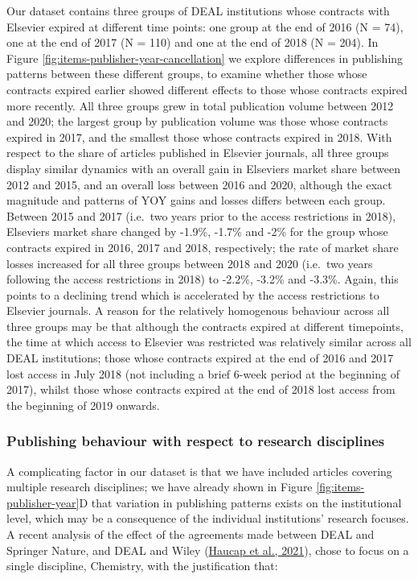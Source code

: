 \documentclass[
]{article}
\begin{document}
Our dataset contains three groups of DEAL institutions whose contracts with Elsevier expired at different time points: one group at the end of 2016 (N = 74), one at the end of 2017 (N = 110) and one at the end of 2018 (N = 204). In Figure \ref{fig:items-publisher-year-cancellation} we explore differences in publishing patterns between these different groups, to examine whether those whose contracts expired earlier showed different effects to those whose contracts expired more recently. All three groups grew in total publication volume between 2012 and 2020; the largest group by publication volume was those whose contracts expired in 2017, and the smallest those whose contracts expired in 2018. With respect to the share of articles published in Elsevier journals, all three groups display similar dynamics with an overall gain in Elsevier\textquotesingle s market share between 2012 and 2015, and an overall loss between 2016 and 2020, although the exact magnitude and patterns of YOY gains and losses differs between each group. Between 2015 and 2017 (i.e.~two years prior to the access restrictions in 2018), Elsevier\textquotesingle s market share changed by -1.9\%, -1.7\% and -2\% for the group whose contracts expired in 2016, 2017 and 2018, respectively; the rate of market share losses increased for all three groups between 2018 and 2020 (i.e.~two years following the access restrictions in 2018) to -2.2\%, -3.2\% and -3.3\%. Again, this points to a declining trend which is accelerated by the access restrictions to Elsevier journals. A reason for the relatively homogenous behaviour across all three groups may be that although the contracts expired at different timepoints, the time at which access to Elsevier was restricted was relatively similar across all DEAL institutions; those whose contracts expired at the end of 2016 and 2017 lost access in July 2018 (not including a brief 6-week period at the beginning of 2017), whilst those whose contracts expired at the end of 2018 lost access from the beginning of 2019 onwards.

\hypertarget{publishing-behaviour-with-respect-to-research-disciplines}{%
\subsubsection{Publishing behaviour with respect to research disciplines}\label{publishing-behaviour-with-respect-to-research-disciplines}}

A complicating factor in our dataset is that we have included articles covering multiple research disciplines; we have already shown in Figure \ref{fig:items-publisher-year}D that variation in publishing patterns exists on the institutional level, which may be a consequence of the individual institutions' research focuses. A recent analysis of the effect of the agreements made between DEAL and Springer Nature, and DEAL and Wiley (\href{https://doi.org/10.1002/mde.3493}{Haucap et al., 2021}), chose to focus on a single discipline, Chemistry, with the justification that:
\end{document}
